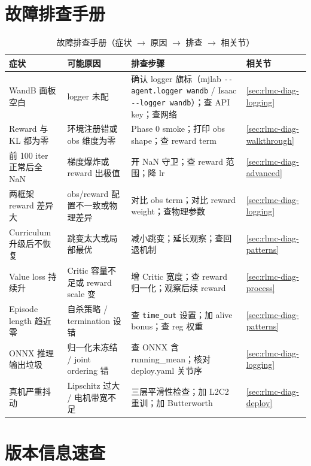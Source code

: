 \section*{故障排查手册}
\label{sec:rlmc-diag-troubleshoot}

\begin{table}[H]
\centering
\caption{故障排查手册（症状 $\to$ 原因 $\to$ 排查 $\to$ 相关节）}
\label{tab:rlmc-diag-troubleshoot}
\begin{tabular}{p{3.0cm}p{3.2cm}p{4.2cm}p{2.0cm}}
\hline
症状 & 可能原因 & 排查步骤 & 相关节 \\
\hline
WandB 面板空白 & logger 未配 & 确认 logger 旗标（mjlab \verb|--agent.logger wandb| / Isaac \verb|--logger wandb|）；查 API key；查网络 & \cref{sec:rlmc-diag-logging} \\
Reward 与 KL 都为零 & 环境注册错或 obs 维度为零 & Phase 0 smoke；打印 obs shape；查 reward term & \cref{sec:rlmc-diag-walkthrough} \\
前 100 iter 正常后全 NaN & 梯度爆炸或 reward 出极值 & 开 NaN 守卫；查 reward 范围；降 lr & \cref{sec:rlmc-diag-advanced} \\
两框架 reward 差异大 & obs/reward 配置不一致或物理差异 & 对比 obs term；对比 reward weight；查物理参数 & \cref{sec:rlmc-diag-logging} \\
Curriculum 升级后不恢复 & 跳变太大或局部最优 & 减小跳变；延长观察；查回退机制 & \cref{sec:rlmc-diag-patterns} \\
Value loss 持续升 & Critic 容量不足或 reward scale 变 & 增 Critic 宽度；查 reward 归一化；观察后续 reward & \cref{sec:rlmc-diag-process} \\
Episode length 趋近零 & 自杀策略 / termination 设错 & 查 \verb|time_out| 设置；加 alive bonus；查 reg 权重 & \cref{sec:rlmc-diag-patterns} \\
ONNX 推理输出垃圾 & 归一化未冻结 / joint ordering 错 & 查 ONNX 含 running\_mean；核对 deploy.yaml 关节序 & \cref{sec:rlmc-diag-logging} \\
真机严重抖动 & Lipschitz 过大 / 电机带宽不足 & 三层平滑性检查；加 L2C2 重训；加 Butterworth & \cref{sec:rlmc-diag-deploy} \\
\hline
\end{tabular}
\end{table}

\section*{版本信息速查}
\label{sec:rlmc-diag-versioninfo}

